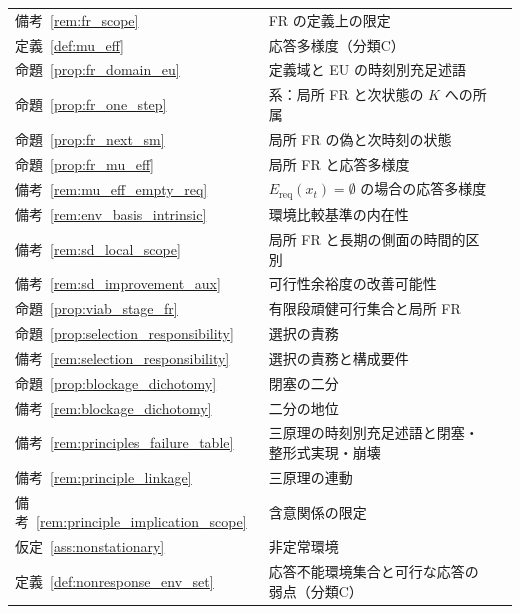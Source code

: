 \begin{longtable}{p{2.4cm} p{10.4cm} r}
備考~\ref{rem:fr_scope} & FR の定義上の限定 & \pageref{rem:fr_scope} \\
定義~\ref{def:mu_eff} & 応答多様度（分類C） & \pageref{def:mu_eff} \\
命題~\ref{prop:fr_domain_eu} & 定義域と EU の時刻別充足述語 & \pageref{prop:fr_domain_eu} \\
命題~\ref{prop:fr_one_step} & 系：局所 FR と次状態の $K$ への所属 & \pageref{prop:fr_one_step} \\
命題~\ref{prop:fr_next_sm} & 局所 FR の偽と次時刻の状態 & \pageref{prop:fr_next_sm} \\
命題~\ref{prop:fr_mu_eff} & 局所 FR と応答多様度 & \pageref{prop:fr_mu_eff} \\
備考~\ref{rem:mu_eff_empty_req} & $E_{\mathrm{req}}(x_t)=\emptyset$ の場合の応答多様度 & \pageref{rem:mu_eff_empty_req} \\
備考~\ref{rem:env_basis_intrinsic} & 環境比較基準の内在性 & \pageref{rem:env_basis_intrinsic} \\
備考~\ref{rem:sd_local_scope} & 局所 FR と長期の側面の時間的区別 & \pageref{rem:sd_local_scope} \\
備考~\ref{rem:sd_improvement_aux} & 可行性余裕度の改善可能性 & \pageref{rem:sd_improvement_aux} \\
命題~\ref{prop:viab_stage_fr} & 有限段頑健可行集合と局所 FR & \pageref{prop:viab_stage_fr} \\
命題~\ref{prop:selection_responsibility} & 選択の責務 & \pageref{prop:selection_responsibility} \\
備考~\ref{rem:selection_responsibility} & 選択の責務と構成要件 & \pageref{rem:selection_responsibility} \\
命題~\ref{prop:blockage_dichotomy} & 閉塞の二分 & \pageref{prop:blockage_dichotomy} \\
備考~\ref{rem:blockage_dichotomy} & 二分の地位 & \pageref{rem:blockage_dichotomy} \\
備考~\ref{rem:principles_failure_table} & 三原理の時刻別充足述語と閉塞・整形式実現・崩壊 & \pageref{rem:principles_failure_table} \\
備考~\ref{rem:principle_linkage} & 三原理の連動 & \pageref{rem:principle_linkage} \\
備考~\ref{rem:principle_implication_scope} & 含意関係の限定 & \pageref{rem:principle_implication_scope} \\
仮定~\ref{ass:nonstationary} & 非定常環境 & \pageref{ass:nonstationary} \\
定義~\ref{def:nonresponse_env_set} & 応答不能環境集合と可行な応答の弱点（分類C） & \pageref{def:nonresponse_env_set} \\

\end{longtable}
